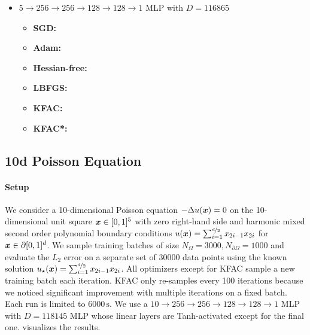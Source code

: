\begin{itemize}
\item $5 \to 256 \to 256\to 128 \to 128 \to 1$ MLP with $D=\num{116865}$
  \begin{itemize}
    \def\pathToRuns{kfac_pinns_exp/exp19_poisson5d_mlp_tanh_256/tex}
  \item \textbf{SGD:} 
  \item \textbf{Adam:} 
  \item \textbf{Hessian-free:} 
  \item \textbf{LBFGS:} 
  \item \textbf{KFAC:} 
  \item \textbf{KFAC*:} 
  \end{itemize}
\end{itemize}

\subsection{10d Poisson Equation}\label{sec:poisson10d-appendix}

\paragraph{Setup} We consider a 10-dimensional Poisson equation $-\Delta u({\bm{x}}) = 0$ on the 10-dimensional unit square ${\bm{x}} \in [0, 1]^5$ with zero right-hand side and harmonic mixed second order polynomial boundary conditions $u({\bm{x}}) = \sum_{i=1}^{\nicefrac{d}{2}} {x}_{2i-1} {x}_{2i}$ for ${\bm{x}} \in \partial [0,1]^d$.
We sample training batches of size $N_{\Omega} = \num{3000}, N_{\partial\Omega} = 1000$ and evaluate the $L_2$ error on a separate set of $\num{30000}$ data points using the known solution $u_{\star}({\bm{x}}) = \sum_{i=1}^{\nicefrac{d}{2}} {x}_{2i-1} {x}_{2i}$.
All optimizers except for KFAC sample a new training batch each iteration.
KFAC only re-samples every 100 iterations because we noticed significant improvement with multiple iterations on a fixed batch.
Each run is limited to $\num{6000}\,\text{s}$.
We use a $10 \to 256 \to 256\to 128 \to 128 \to 1$ MLP with $D=\num{118145}$ MLP whose linear layers are Tanh-activated except for the final one.
 visualizes the results.

